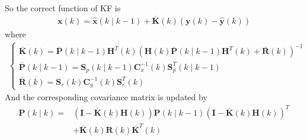 \documentclass[dvipdfmx]{jsarticle}
\begin{document}
So the correct function of KF is
\begin{equation}\label{Func.}\begin{aligned}
    \mathbf{x}(k)=\widehat{\mathbf{x}}(k \mid k-1)+\overline{\mathbf{K}}(k)(\mathbf{y}(k)-\widehat{\mathbf{y}}(k))
\end{aligned}\end{equation}
where
\begin{equation}\label{Func.}\begin{aligned}
    \left\{\begin{array}{l}
        \overline{\mathbf{K}}(k)=\overline{\mathbf{P}}(k \mid k-1) \mathbf{H}^{T}(k)\left(\mathbf{H}(k) \overline{\mathbf{P}}(k \mid k-1) \mathbf{H}^{T}(k)+\overline{\mathbf{R}}(k)\right)^{-1} \\
        \overline{\mathbf{P}}(k \mid k-1)=\mathbf{S}_{p}(k \mid k-1) \mathbf{C}_{x}^{-1}(k) \mathbf{S}_{p}^{T}(k \mid k-1) \\
        \overline{\mathbf{R}}(k)=\mathbf{S}_{r}(k) \mathbf{C}_{y}^{-1}(k) \mathbf{S}_{r}^{T}(k)
        \end{array}\right.
\end{aligned}\end{equation}
And the corresponding covariance matrix is updated by
\begin{equation}\label{Func.}\begin{aligned}
        \mathbf{P}(k \mid k)=&(\mathbf{I}-\overline{\mathbf{K}}(k) \mathbf{H}(k)) \mathbf{P}(k \mid k-1)(\mathbf{I}-\overline{\mathbf{K}}(k) \mathbf{H}(k))^{T} \\
        &+\overline{\mathbf{K}}(k) \mathbf{R}(k) \overline{\mathbf{K}}^{T}(k)
\end{aligned}\end{equation}
\end{document}
